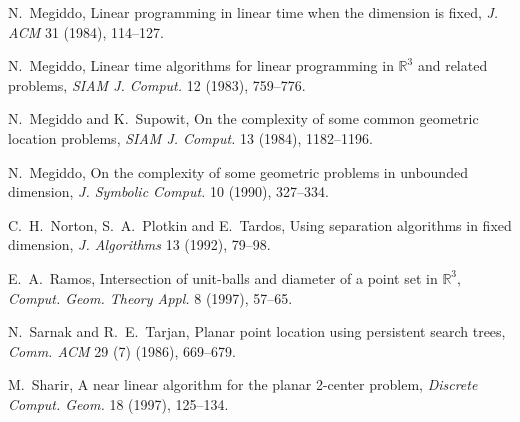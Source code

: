 \documentclass[a4paper,12pt]{article}
\begin{document}
\begin{thebibliography}{}
N.~Megiddo,
Linear programming in linear time when the dimension is fixed,
{\it J. ACM} 31 (1984), 114--127.

N.~Megiddo,
Linear time algorithms for linear programming in $\mathbb{R}^3$
and related problems,
{\it SIAM J. Comput.} 12 (1983), 759--776.

N.~Megiddo and K.~Supowit,
On the complexity of some common geometric location problems,
{\it SIAM J. Comput.} 13 (1984), 1182--1196.

N.~Megiddo, On the complexity of some geometric problems in unbounded dimension,
{\it J. Symbolic Comput.} 10 (1990), 327--334.

C.~H.~Norton, S.~A.~Plotkin and E.~Tardos,
Using separation algorithms in fixed dimension,
{\it J. Algorithms} 13 (1992), 79--98.

E.~A.~Ramos,
Intersection of unit-balls and diameter of a point set in $\mathbb{R}^3$,
{\it Comput. Geom. Theory Appl.} 8 (1997), 57--65.

N.~Sarnak and R.~E.~Tarjan,
Planar point location using persistent search trees,
{\it Comm. ACM} 29 (7) (1986), 669--679.

M.~Sharir,
A near linear algorithm for the planar 2-center problem,
{\it Discrete Comput. Geom.} 18 (1997), 125--134.

\end{thebibliography}
\end{document}
